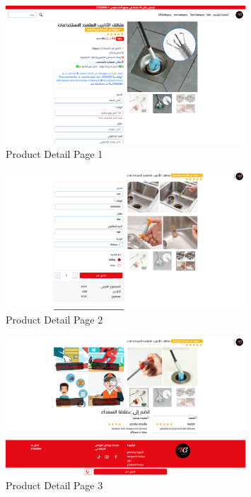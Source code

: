 \begin{itemize}
    \begin{figure}[H]
        \centering
        \includegraphics[width=0.8\textwidth]{images/productDetailPage1.png}
        \caption{Product Detail Page 1}
        \label{fig:product_detail_page_one}
    \end{figure}
    \begin{figure}[H]
        \centering
        \includegraphics[width=0.8\textwidth]{images/productDetailPage2.png}
        \caption{Product Detail Page 2}
        \label{fig:product_detail_page_two}
    \end{figure}    
    \begin{figure}[H]
        \centering
        \includegraphics[width=0.8\textwidth]{images/productDetailPage3.png}
        \caption{Product Detail Page 3}

\end{figure}
\end{itemize}

